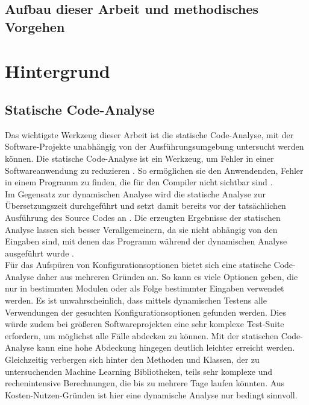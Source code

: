 \documentclass[german,bachelor]{swsLeipzig}
\begin{document}
\section{Aufbau dieser Arbeit und methodisches Vorgehen}

\chapter{Hintergrund}\label{Hintergrund}

\section{Statische Code-Analyse}
Das wichtigste Werkzeug dieser Arbeit ist die statische Code-Analyse,
mit der Software-Projekte unabhängig von der Ausführungsumgebung untersucht werden können.
Die statische Code-Analyse ist ein Werkzeug, um Fehler in einer Softwareanwendung zu reduzieren \cite[S. 99]{bardas2010static}.
So ermöglichen sie den Anwendenden, Fehler in einem Programm zu finden, die für den Compiler nicht sichtbar sind \cite[S. 99]{bardas2010static}.\\

Im Gegensatz zur dynamischen Analyse wird die statische Analyse zur Übersetzungszeit durchgeführt
und setzt damit bereits vor der tatsächlichen Ausführung des Source Codes an \cite[S. 2]{gomes2009overview}.
Die erzeugten Ergebnisse der statischen Analyse lassen sich besser Verallgemeinern, da sie nicht abhängig von den Eingaben sind,
mit denen das Programm während der dynamischen Analyse ausgeführt wurde \cite[S. 6]{gomes2009overview}.\\

Für das Aufspüren von Konfigurationsoptionen bietet sich eine statische Code-Analyse daher aus mehreren Gründen an.
So kann es viele Optionen geben, die nur in bestimmten Modulen oder als Folge bestimmter Eingaben verwendet werden.
Es ist unwahrscheinlich, dass mittels dynamischen Testens alle Verwendungen der gesuchten Konfigurationsoptionen gefunden werden.
Dies würde zudem bei größeren Softwareprojekten eine sehr komplexe Test-Suite erfordern, um möglichst alle Fälle abdecken zu können.
Mit der statischen Code-Analyse kann eine hohe Abdeckung hingegen deutlich leichter erreicht werden.
Gleichzeitig verbergen sich hinter den Methoden und Klassen, der zu untersuchenden Machine Learning Bibliotheken,
teils sehr komplexe und rechenintensive Berechnungen, die bis zu mehrere Tage laufen könnten.
Aus Kosten-Nutzen-Gründen ist hier eine dynamische Analyse nur bedingt sinnvoll.\\
\end{document}
